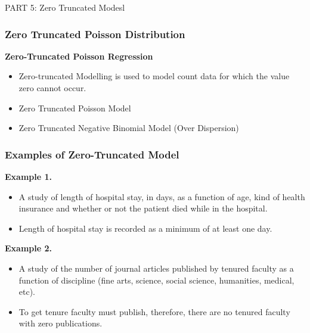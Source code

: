 \documentclass[MASTER.tex]{subfiles}
\begin{document}
	
	\begin{frame}
		
		{\LARGE
			PART 5:	Zero Truncated Modesl
		} \bigskip
		\Large
		
		\medskip

	\end{frame}
	\begin{frame}
		\frametitle{Zero Truncated Poisson Distribution}
		\Large
		\textbf{Zero-Truncated Poisson Regression}
		\begin{itemize}
		\item Zero-truncated Modelling is used to model count data for which the value zero cannot occur.
		\item Zero Truncated Poisson Model 
		\item Zero Truncated Negative Binomial Model (Over Dispersion)
		\end{itemize}
		
		\end{frame}
\begin{frame}
	\frametitle{Examples of Zero-Truncated Model}
	
	\textbf{Example 1.}
	\begin{itemize}
		\item A study of length of hospital stay, in days, as a function of age, kind of health insurance and whether or not the patient died while in the hospital. 
		\item Length of hospital stay is recorded as a minimum of at least one day.
	\end{itemize}

	\textbf{Example 2.}
	\begin{itemize} 
		\item A study of the number of journal articles published by tenured faculty as a function of discipline (fine arts, science, social science, humanities, medical, etc).
		\item To get tenure faculty must publish, therefore, there are no tenured faculty with zero publications.
	\end{itemize}
\end{frame}
\end{document}
